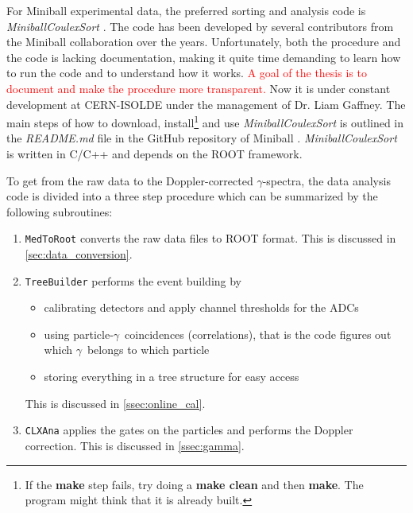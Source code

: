 \documentclass[twoside,english]{uiofysmaster/uiofysmaster}
\newcommand{\ga}{$\gamma$}
\let\orgautoref\autoref
\renewcommand{\autoref}
        {%
		 \def\sectionautorefname{Section}%
		 \def\subsectionautorefname{Section}%
		 \def\subsubsectionautorefname{Section}%
		 \def\chapterautorefname{Chapter}%
          \orgautoref}
\begin{document}

For Miniball experimental data, the preferred sorting and analysis code is \textsl{MiniballCoulexSort} \cite{MBCS}.
The code has been developed by several contributors from the Miniball collaboration over the years. 
Unfortunately, both the procedure and the code is lacking documentation, making it quite time demanding to learn how to run the code and to understand how it works.
\textcolor{red}{A goal of the thesis is to document and make the procedure more transparent.}
Now it is under constant development at CERN-ISOLDE under the management of Dr. Liam Gaffney. 
The main steps of how to download, install\footnote{If the \textbf{make} step fails, try doing a \textbf{make clean} and then \textbf{make}. The program might think that it is already built.} and use \textsl{MiniballCoulexSort} is outlined in the \textit{README.md} file in the GitHub repository of Miniball \cite{MBCS}. 
\textsl{MiniballCoulexSort} is written in C/C++ and depends on the ROOT framework. 

To get from the raw data to the Doppler-corrected \ga-spectra, the data analysis code is divided into a three step procedure which can be summarized by the following subroutines:

\begin{enumerate}
	\item \texttt{MedToRoot} converts the raw data files to ROOT format. This is discussed in  \autoref{sec:data_conversion}.
	\item \texttt{TreeBuilder} performs the event building by
		\begin{itemize}
			\item calibrating detectors and apply channel thresholds for the ADCs
			\item using particle-\ga\ coincidences (correlations), that is the code figures out which \ga\ belongs to which particle
			\item storing everything in a tree structure for easy access
		\end{itemize}
		This is discussed in \autoref{ssec:online_cal}.
	\item \texttt{CLXAna} applies the gates on the particles and performs the Doppler correction. This is discussed in \autoref{ssec:gamma}.
\end{enumerate}
\end{document}
